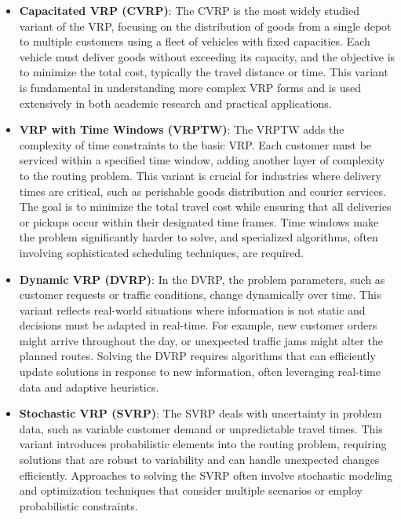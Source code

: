 \documentclass{article}
\begin{document}
    \begin{itemize}
        \item \textbf{Capacitated VRP (CVRP)}:
        The CVRP is the most widely studied variant of the VRP, focusing on the distribution of goods from a single depot to multiple customers using a fleet of vehicles with fixed capacities. Each vehicle must deliver goods without exceeding its capacity, and the objective is to minimize the total cost, typically the travel distance or time. This variant is fundamental in understanding more complex VRP forms and is used extensively in both academic research and practical applications. \cite{konstantakopoulos2022vehicle}

        \item \textbf{VRP with Time Windows (VRPTW)}:
        The VRPTW adds the complexity of time constraints to the basic VRP. Each customer must be serviced within a specified time window, adding another layer of complexity to the routing problem. This variant is crucial for industries where delivery times are critical, such as perishable goods distribution and courier services. The goal is to minimize the total travel cost while ensuring that all deliveries or pickups occur within their designated time frames. Time windows make the problem significantly harder to solve, and specialized algorithms, often involving sophisticated scheduling techniques, are required.\cite{vidal2013}

        \item \textbf{Dynamic VRP (DVRP)}:
        In the DVRP, the problem parameters, such as customer requests or traffic conditions, change dynamically over time. This variant reflects real-world situations where information is not static and decisions must be adapted in real-time. For example, new customer orders might arrive throughout the day, or unexpected traffic jams might alter the planned routes. Solving the DVRP requires algorithms that can efficiently update solutions in response to new information, often leveraging real-time data and adaptive heuristics. \cite[pp. 299--334]{toth2014vehicle}

        \item \textbf{Stochastic VRP (SVRP)}:
        The SVRP deals with uncertainty in problem data, such as variable customer demand or unpredictable travel times. This variant introduces probabilistic elements into the routing problem, requiring solutions that are robust to variability and can handle unexpected changes efficiently. Approaches to solving the SVRP often involve stochastic modeling and optimization techniques that consider multiple scenarios or employ probabilistic constraints.\cite{rajabi2021reliable}



\end{itemize}
\end{document}
